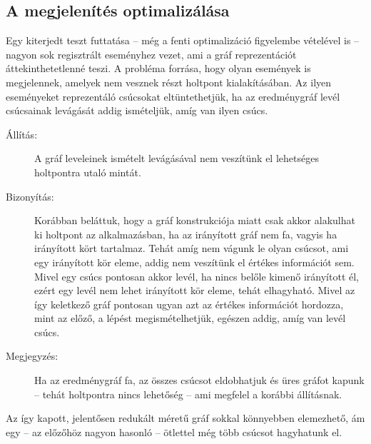     
    \subsection{A megjelenítés optimalizálása}
    Egy kiterjedt teszt futtatása -- még a fenti optimalizáció figyelembe vételével is --nagyon sok regisztrált eseményhez vezet, ami a gráf reprezentációt áttekinthetetlenné teszi. A probléma forrása, hogy olyan események is megjelennek, amelyek nem vesznek részt holtpont kialakításában. Az ilyen eseményeket reprezentáló csúcsokat eltüntethetjük, ha az eredménygráf levél csúcsainak levágását addig ismételjük, amíg van ilyen csúcs.
    
    \begin{description}
        \item[Állítás:] A gráf leveleinek ismételt levágásával nem veszítünk el lehetséges holtpontra utaló mintát.
        \item[Bizonyítás:] Korábban beláttuk, hogy a gráf konstrukciója miatt csak akkor alakulhat ki holtpont az alkalmazásban, ha az irányított gráf nem fa, vagyis ha irányított kört tartalmaz. Tehát amíg nem vágunk le olyan csúcsot, ami egy irányított kör eleme, addig nem veszítünk el értékes információt sem. Mivel egy csúcs pontosan akkor levél, ha nincs belőle kimenő irányított él, ezért egy levél nem lehet irányított kör eleme, tehát elhagyható. Mivel az így keletkező gráf pontosan ugyan azt az értékes információt hordozza, mint az előző, a lépést megismételhetjük, egészen addig, amíg van levél csúcs.
        \item[Megjegyzés:] Ha az eredménygráf fa, az összes csúcsot eldobhatjuk és üres gráfot kapunk -- tehát holtpontra nincs lehetőség -- ami megfelel a korábbi állításnak.
    \end{description}
%    
    Az így kapott, jelentősen redukált méretű gráf sokkal könnyebben elemezhető, ám egy -- az előzőhöz nagyon hasonló -- ötlettel még több csúcsot hagyhatunk el.
    
